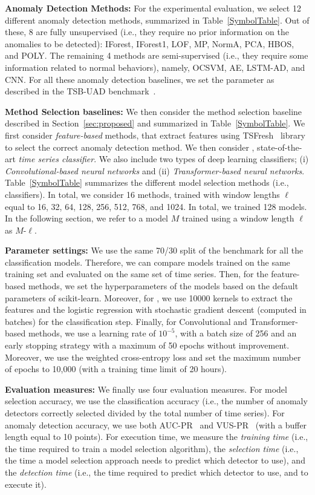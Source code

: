 \noindent \textbf{Anomaly Detection Methods: }
For the experimental evaluation, we select 12 different anomaly detection methods, summarized in Table~\ref{SymbolTable}. Out of these, 8 are fully unsupervised (i.e., they require no prior information on the anomalies to be detected): IForest, IForest1, LOF, MP, NormA, PCA, HBOS, and POLY. The remaining 4 methods are semi-supervised (i.e., they require some information related to normal behaviors), namely, OCSVM, AE, LSTM-AD, and CNN. For all these anomaly detection baselines, we set the parameter as described in the TSB-UAD benchmark~\cite{10.14778/3529337.3529354}.

\noindent \textbf{Method Selection baselines: }
We then consider the method selection baseline described in Section~\ref{sec:proposed} and summarized in Table~\ref{SymbolTable}. We first consider {\it feature-based} methods, that extract features using TSFresh~\cite{CHRIST201872} library to select the correct anomaly detection method. We then consider , state-of-the-art {\it time series classifier}. We also include two types of deep learning classifiers; (i) {\it Convolutional-based neural networks} and (ii) {\it Transformer-based neural networks}. Table~\ref{SymbolTable} summarizes the different model selection methods (i.e., classifiers). In total, we consider 16 methods, trained with window lengths $\ell$ equal to 16, 32, 64, 128, 256, 512, 768, and 1024. In total, we trained 128 models. In the following section, we refer to a model $M$ trained using a window length $\ell$ as $M$-$\ell$.

\noindent \textbf{Parameter settings: }
We use the same 70/30 split of the benchmark for all the classification models. Therefore, we can compare models trained on the same training set and evaluated on the same set of time series. Then, for the feature-based methods, we set the hyperparameters of the models based on the default parameters of scikit-learn. Moreover, for , we use 10000 kernels to extract the features and the logistic regression with stochastic gradient descent (computed in batches) for the classification step. Finally, for Convolutional and Transformer-based methods, we use a learning rate of $10^{-5}$, with a batch size of 256 and an early stopping strategy with a maximum of 50 epochs without improvement. Moreover, we use the weighted cross-entropy loss and set the maximum number of epochs to 10,000 (with a training time limit of 20 hours).

\noindent \textbf{Evaluation measures: }
We finally use four evaluation measures. For model selection accuracy, we use the classification accuracy (i.e., the number of anomaly detectors correctly selected divided by the total number of time series). For anomaly detection accuracy, we use both AUC-PR~\cite{10.1145/1143844.1143874} and VUS-PR~\cite{10.14778/3551793.3551830} (with a buffer length equal to 10 points). For execution time, we measure the {\it training time} (i.e., the time required to train a model selection algorithm), the {\it selection time} (i.e., the time a model selection approach needs to predict which detector to use), and the {\it detection time} (i.e., the time required to predict which detector to use, and to execute it).

